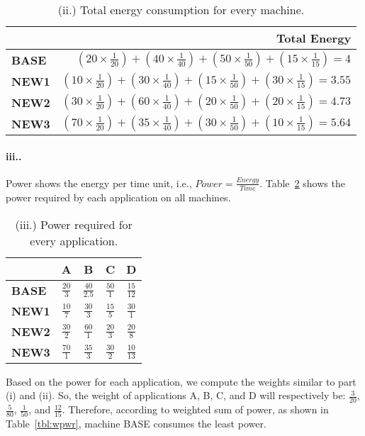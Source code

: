 \documentclass[12pt]{article}
\newcommand{\partt}[1]{\paragraph*{{#1}.}}
\begin{document}
\begin{table}[h]
\center
\begin{tabular}{|l|r|}
	\hline
	 & \textbf{Total Energy} \\
	\hline
	\textbf{BASE} & $(20 \times \frac{1}{20}) + (40 \times \frac{1}{40}) + 
	(50 \times \frac{1}{50}) + (15 \times \frac{1}{15}) = 4$  \\
	\hline
	\textbf{NEW1} & $(10 \times \frac{1}{20}) + (30 \times \frac{1}{40}) + 
	(15 \times \frac{1}{50}) + (30 \times \frac{1}{15}) = 3.55$ \\
	\hline
	\textbf{NEW2} & $(30 \times \frac{1}{20}) + (60 \times \frac{1}{40}) + 
	(20 \times \frac{1}{50}) + (20 \times \frac{1}{15}) = 4.73$ \\
	\hline
	\textbf{NEW3} & $(70 \times \frac{1}{20}) + (35 \times \frac{1}{40}) + 
	(30 \times \frac{1}{50}) + (10 \times \frac{1}{15}) = 5.64$ \\
	\hline
\end{tabular}
\caption{(ii.) Total energy consumption for every machine.}
\label{tbl:wenrgy}
\end{table}


\partt{iii.} Power shows the energy per time unit, i.e., $Power = 
\frac{Energy}{Time}$. Table~\ref{tbl:power} shows the power required by 
each application on all machines.

\begin{table}[h]
\center
\begin{tabular}{|l|c|c|c|c|}
	\hline
	 & \textbf{A} & \textbf{B} & \textbf{C} & \textbf{D} \\
	\hline
	\textbf{BASE} & $\frac{20}{3}$ & $\frac{40}{2.5}$ & $\frac{50}{1}$ 
	& $\frac{15}{12}$ \\
	\hline
	\textbf{NEW1} & $\frac{10}{7}$ & $\frac{30}{3}$ & $\frac{15}{5}$ 
	& $\frac{30}{1}$ \\
	\hline
	\textbf{NEW2} & $\frac{30}{2}$ & $\frac{60}{1}$ & $\frac{20}{3}$ 
	& $\frac{20}{8}$ \\
	\hline
	\textbf{NEW3} & $\frac{70}{1}$ & $\frac{35}{3}$ & $\frac{30}{2}$ 
	& $\frac{10}{13}$ \\
	\hline
\end{tabular}
\caption{(iii.) Power required for every application.}
\label{tbl:power}
\end{table}

Based on the power for each application, we compute the weights similar to 
part (i) and (ii). So, the weight of applications A, B, C, and D will respectively 
be: $\frac{3}{20}$, $\frac{5}{80}$, $\frac{1}{50}$, and $\frac{12}{15}$. 
Therefore, according to weighted sum of power, as shown in 
Table~\ref{tbl:wpwr}, machine BASE consumes the least power.
\end{document}

